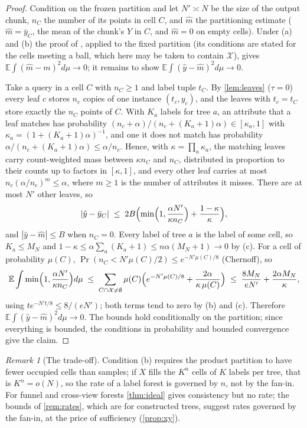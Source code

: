 \documentclass[11pt]{article}
\theoremstyle{definition}
\theoremstyle{remark}
\newtheorem{remark}[theorem]{Remark}
\newcommand{\E}{\mathbb{E}}
\newcommand{\hy}{\hat{y}}
\begin{document}
\begin{proof}
Condition on the frozen partition and let $N'\asymp N$ be the size of the output chunk,
$n_C$ the number of its points in cell $C$, and $\hat m$ the partitioning estimate
($\hat m=\bar y_C$, the mean of the chunk's $Y$ in $C$, and $\hat m=0$ on empty cells).
Under (a) and (b) the proof of \citet[Thm.~4.2]{gyorfi2002}, applied to the fixed
partition (its conditions are stated for the cells meeting a ball, which here may be
taken to contain $\mathcal X$), gives $\E\int(\hat m-m)^2d\mu\to0$; it remains to show
$\E\int(\hy-\hat m)^2d\mu\to0$.

Take a query in a cell $C$ with $n_C\ge1$ and label tuple $t_C$.  By \cref{lem:leaves}
($\tau=0$) every leaf $c$ stores $n_c$ copies of one instance $(t_c,y_c)$, and the leaves
with $t_c=t_C$ store exactly the $n_C$ points of $C$.  With $K_a$ labels for tree $a$, an
attribute that a leaf matches has probability
$(n_c+\alpha)/(n_c+(K_a+1)\alpha)\in[\kappa_a,1]$ with $\kappa_a=(1+(K_a+1)\alpha)^{-1}$, and
one it does not match has probability $\alpha/(n_c+(K_a+1)\alpha)\le\alpha/n_c$.  Hence,
with $\kappa=\prod_a\kappa_a$, the matching leaves carry count-weighted mass between
$\kappa n_C$ and $n_C$, distributed in proportion to their counts up to factors in
$[\kappa,1]$, and every other leaf carries at most $n_c(\alpha/n_c)^m\le\alpha$, where
$m\ge1$ is the number of attributes it misses.  There are at most $N'$ other leaves, so
\[
  |\hy-\bar y_C|\;\le\;2B\Bigl(\min\Bigl(1,\frac{\alpha N'}{\kappa n_C}\Bigr)+\frac{1-\kappa}{\kappa}\Bigr),
\]
and $|\hy-\hat m|\le B$ when $n_C=0$.  Every label of tree $a$ is the label of some cell,
so $K_a\le M_N$ and $1-\kappa\le\alpha\sum_a(K_a+1)\le n\alpha(M_N+1)\to0$ by (c).  For a cell of probability $\mu(C)$,
$\Pr(n_C<N'\mu(C)/2)\le e^{-N'\mu(C)/8}$ (Chernoff), so
\[
  \E\int\min\Bigl(1,\frac{\alpha N'}{\kappa n_C}\Bigr)d\mu\;\le\;
  \sum_{C\cap\mathcal X\ne\emptyset}\mu(C)\Bigl(e^{-N'\mu(C)/8}+\frac{2\alpha}{\kappa\,\mu(C)}\Bigr)
  \;\le\;\frac{8M_N}{eN'}+\frac{2\alpha M_N}{\kappa},
\]
using $te^{-N't/8}\le8/(eN')$; both terms tend to zero by (b) and (c).  Therefore $\E\int(\hy-\hat m)^2d\mu\to0$.  The bounds hold conditionally on the
partition; since everything is bounded, the conditions in probability and bounded
convergence give the claim.
\end{proof}

\begin{remark}[The trade-off]\label{rem:tradeoff}
Condition (b) requires the product partition to have fewer occupied cells than samples;
if $X$ fills the $K^n$ cells of $K$ labels per tree, that is $K^n=o(N)$, so the rate of a
label forest is governed by $n$, not by the fan-in.  For funnel and cross-view forests
\cref{thm:ideal} gives consistency but no rate; the bounds of \cref{rem:rates}, which are
for constructed trees, suggest rates governed by the fan-in, at the price of sufficiency
(\cref{prop:xy}).
\end{remark}
\end{document}
